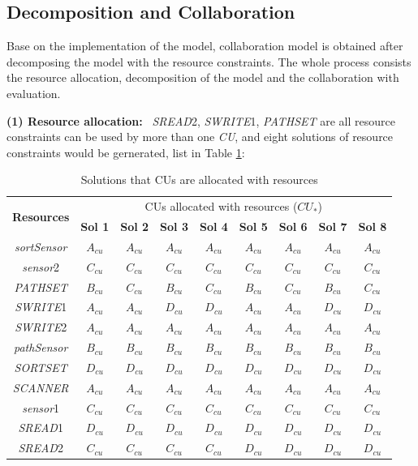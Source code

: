 \subsection{Decomposition and Collaboration}
Base on the implementation of the model, collaboration model is obtained after decomposing the model with the resource constraints. The whole process consists the resource allocation, decomposition of the model and the collaboration with evaluation.

\textbf{(1) Resource allocation:} \
 \emph{SREAD}2, \emph{SWRITE}1, \emph{PATHSET} are all resource constraints can be used by more than one \emph{CU}, and eight solutions of resource constraints would be gernerated, list in Table \ref{ResourcesAllocation}:

\begin{table}[htb!]
 \centering

\bahao
\caption{\label{ResourcesAllocation}Solutions that CUs are allocated with resources}
\begin{tabular}{|c|c|c|c|c|c|c|c|c|}

\hline

\multirow{2}{*}{\textbf{Resources}} &
\multicolumn{8}{|c|}{CUs allocated with resources ($CU_{\ast}$)} \\
\cline{2-9}
   &\textbf{ Sol 1 } &\textbf{ Sol 2 } &\textbf{ Sol 3 } &\textbf{ Sol 4 } &\textbf{Sol 5 } &\textbf{ Sol 6 } &\textbf{ Sol 7 } &\textbf{ Sol 8 }\\
\hline
\emph{sortSensor}   &$A_{cu}$ &$A_{cu}$ &$A_{cu}$ &$A_{cu}$ &$A_{cu}$ &$A_{cu}$ &$A_{cu}$ &$A_{cu}$ \\
\emph{sensor}2      &$C_{cu}$ &$C_{cu}$ &$C_{cu}$ &$C_{cu}$ &$C_{cu}$ &$C_{cu}$ &$C_{cu}$ &$C_{cu}$ \\
\emph{PATHSET}      &$B_{cu}$ &$C_{cu}$ &$B_{cu}$ &$C_{cu}$ &$B_{cu}$ &$C_{cu}$ &$B_{cu}$ &$C_{cu}$ \\
\emph{SWRITE}1      &$A_{cu}$ &$A_{cu}$ &$D_{cu}$ &$D_{cu}$ &$A_{cu}$ &$A_{cu}$ &$D_{cu}$ &$D_{cu}$ \\
\emph{SWRITE}2      &$A_{cu}$ &$A_{cu}$ &$A_{cu}$ &$A_{cu}$ &$A_{cu}$ &$A_{cu}$ &$A_{cu}$ &$A_{cu}$ \\
\emph{pathSensor}   &$B_{cu}$ &$B_{cu}$ &$B_{cu}$ &$B_{cu}$ &$B_{cu}$ &$B_{cu}$ &$B_{cu}$ &$B_{cu}$ \\
\emph{SORTSET}      &$D_{cu}$ &$D_{cu}$ &$D_{cu}$ &$D_{cu}$ &$D_{cu}$ &$D_{cu}$ &$D_{cu}$ &$D_{cu}$ \\
\emph{SCANNER}      &$A_{cu}$ &$A_{cu}$ &$A_{cu}$ &$A_{cu}$ &$A_{cu}$ &$A_{cu}$ &$A_{cu}$ &$A_{cu}$ \\
\emph{sensor}1      &$C_{cu}$ &$C_{cu}$ &$C_{cu}$ &$C_{cu}$ &$C_{cu}$ &$C_{cu}$ &$C_{cu}$ &$C_{cu}$ \\
\emph{SREAD}1       &$D_{cu}$ &$D_{cu}$ &$D_{cu}$ &$D_{cu}$ &$D_{cu}$ &$D_{cu}$ &$D_{cu}$ &$D_{cu}$ \\
\emph{SREAD}2       &$C_{cu}$ &$C_{cu}$ &$C_{cu}$ &$C_{cu}$ &$D_{cu}$ &$D_{cu}$ &$D_{cu}$ &$D_{cu}$ \\


\end{tabular}
\end{table}
